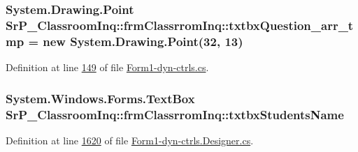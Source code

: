 \hypertarget{class_sr_p___classroom_inq_1_1frm_classrrom_inq_a09f25b6934ed463e8b781498b5511796}{
\subsubsection[{txtbx\-Question\-\_\-arr\-\_\-tmp}]{\setlength{\rightskip}{0pt plus 5cm}\-System.\-Drawing.\-Point {\bf \-Sr\-P\-\_\-\-Classroom\-Inq\-::frm\-Classrrom\-Inq\-::txtbx\-Question\-\_\-arr\-\_\-tmp} = new \-System.\-Drawing.\-Point(32, 13)}}
\label{class_sr_p___classroom_inq_1_1frm_classrrom_inq_a09f25b6934ed463e8b781498b5511796}


\-Definition at line \hyperlink{_form1-dyn-ctrls_8cs_source_l00149}{149} of file \hyperlink{_form1-dyn-ctrls_8cs_source}{\-Form1-\/dyn-\/ctrls.\-cs}.

\hypertarget{class_sr_p___classroom_inq_1_1frm_classrrom_inq_ad797f7d682d2f40b509b4904fac76461}{
\subsubsection[{txtbx\-Students\-Name}]{\setlength{\rightskip}{0pt plus 5cm}\-System.\-Windows.\-Forms.\-Text\-Box {\bf \-Sr\-P\-\_\-\-Classroom\-Inq\-::frm\-Classrrom\-Inq\-::txtbx\-Students\-Name}}}
\label{class_sr_p___classroom_inq_1_1frm_classrrom_inq_ad797f7d682d2f40b509b4904fac76461}


\-Definition at line \hyperlink{_form1-dyn-ctrls_8_designer_8cs_source_l01620}{1620} of file \hyperlink{_form1-dyn-ctrls_8_designer_8cs_source}{\-Form1-\/dyn-\/ctrls.\-Designer.\-cs}.


